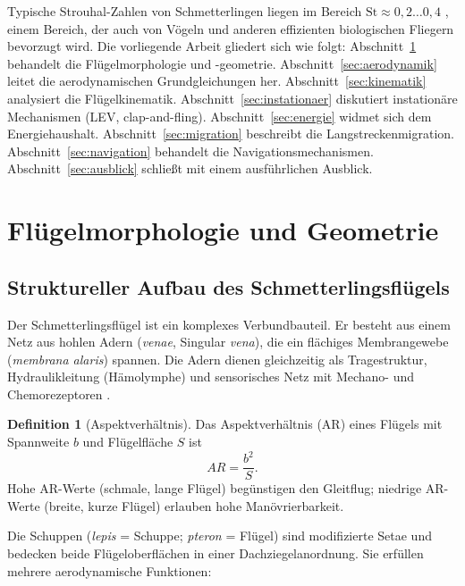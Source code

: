 ﻿\documentclass[a4paper,12pt]{article}
\theoremstyle{definition}
\newtheorem{definition}{Definition}
\begin{document}
	Typische Strouhal-Zahlen von Schmetterlingen liegen im Bereich
	$\mathrm{St} \approx 0{,}2\ldots0{,}4$ \cite{ellington1996leading},
	einem Bereich, der auch von Vögeln und anderen effizienten biologischen Fliegern bevorzugt
	wird.
	Die vorliegende Arbeit gliedert sich wie folgt:
	Abschnitt~\ref{sec:morphologie} behandelt die Flügelmorphologie und -geometrie.
	Abschnitt~\ref{sec:aerodynamik} leitet die aerodynamischen Grundgleichungen her.
	Abschnitt~\ref{sec:kinematik} analysiert die Flügelkinematik.
	Abschnitt~\ref{sec:instationaer} diskutiert instationäre Mechanismen (LEV, clap-and-fling).
	Abschnitt~\ref{sec:energie} widmet sich dem Energiehaushalt.
	Abschnitt~\ref{sec:migration} beschreibt die Langstreckenmigration.
	Abschnitt~\ref{sec:navigation} behandelt die Navigationsmechanismen.
	Abschnitt~\ref{sec:ausblick} schließt mit einem ausführlichen Ausblick.
	
	\section{Flügelmorphologie und Geometrie}
	\label{sec:morphologie}
	
	\subsection{Struktureller Aufbau des Schmetterlingsflügels}
	
	Der Schmetterlingsflügel ist ein komplexes Verbundbauteil.
	Er besteht aus einem Netz aus hohlen Adern (\textit{venae}, Singular \textit{vena}),
	die ein flächiges Membrangewebe (\textit{membrana alaris}) spannen.
	Die Adern dienen gleichzeitig als Tragestruktur, Hydraulikleitung
	(Hämolymphe) und sensorisches Netz mit Mechano- und Chemorezeptoren
	\cite{wootton1981support}.
	
	\begin{definition}[Aspektverhältnis]
		Das Aspektverhältnis (AR) eines Flügels mit Spannweite $b$ und Flügelfläche $S$ ist
		\[
		AR = \frac{b^2}{S}.
		\]
		Hohe AR-Werte (schmale, lange Flügel) begünstigen den Gleitflug;
		niedrige AR-Werte (breite, kurze Flügel) erlauben hohe Manövrierbarkeit.
	\end{definition}
	
	Die Schuppen (\textit{lepis} = Schuppe; \textit{pteron} = Flügel) sind modifizierte
	Setae und bedecken beide Flügeloberflächen in einer Dachziegelanordnung.
	Sie erfüllen mehrere aerodynamische Funktionen:
	
\end{document}
